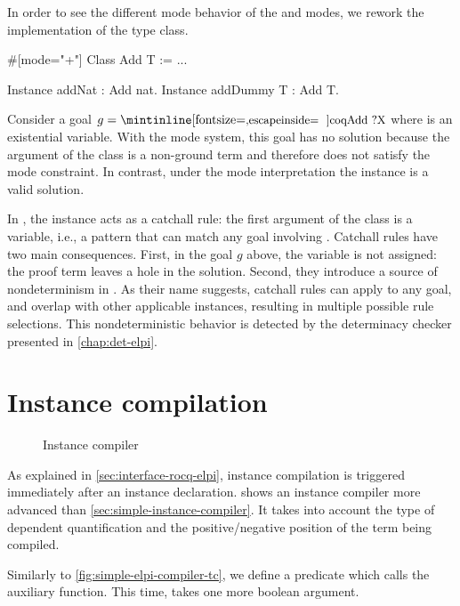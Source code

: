 In order to see the different mode behavior of the \rocq and \elpi modes, we
rework the implementation of the  type class.
%
\begin{coqcode}
#[mode="+"] Class Add T := ...

Instance addNat : Add nat.
Instance addDummy T : Add T.
\end{coqcode}


Consider a goal $g = \cI{Add ?X}$ where  is an existential
variable. With the \rocq mode system, this goal has no solution because the
argument of the class is a non-ground term and therefore does not satisfy the
mode constraint. In contrast, under the \elpi mode interpretation the instance
 is a valid solution.

In \elpi, the instance  acts as a catchall rule: the first argument
of the  class is a variable, i.e., a pattern that can match any goal
involving . Catchall rules have two main consequences. First, in the
goal $g$ above, the variable  is not assigned: the proof term leaves a hole in
the solution. Second, they introduce a source of nondeterminism in \elpi. As
their name suggests, catchall rules can apply to any goal, and
overlap with other applicable instances, resulting in multiple possible rule
selections. This nondeterministic behavior is detected by the determinacy
checker presented in \cref{chap:det-elpi}.

\section{Instance compilation}
\label{sec:instance-encoding}

\begin{figure}
  
  \caption{Instance compiler}
  \label{fig:simple-elpi-compiler}
\end{figure}

As explained in \cref{sec:interface-rocq-elpi}, instance compilation is
triggered immediately after an instance declaration.
 shows an instance compiler more advanced than
\cref{sec:simple-instance-compiler}. It takes into account the type of dependent
quantification and the positive/negative position of the term being compiled.

Similarly to \cref{fig:simple-elpi-compiler-tc}, we define a 
predicate which calls the  auxiliary function. This time, 
takes one more boolean argument.

